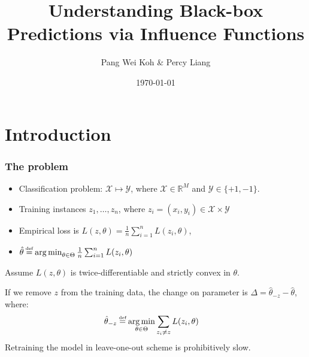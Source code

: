 \documentclass[UTF8]{beamer}
\title{Understanding Black-box Predictions via Influence Functions}
\author{Pang Wei Koh \& Percy Liang}
\date{\today}
\newcommand\myeq{\stackrel{\mathclap{\tiny\mbox{def}}}{=}}
\DeclareMathOperator*{\argmin}{arg\,min}
\begin{document}
\frame{\titlepage}

\section[Outline]{}
\frame{\tableofcontents}

\section{Introduction}
\begin{frame}
\frametitle{The problem}
\begin{itemize}
\item Classification problem: $\mathcal{X} \mapsto \mathcal{Y}$, where $\mathcal{X}\in\mathbb{R}^M$ and $\mathcal{Y}\in\{+1, -1\}$.\\
\item Training instances $z_1,\dots, z_n$, where $z_i = (x_i, y_i) \in \mathcal{X}\times\mathcal{Y}$\\
\item Empirical loss is $L(z, \theta) = \frac{1}{n}\sum_{i=1}^{n}L(z_i, \theta)$, 
\item $\hat{\theta} \myeq \argmin_{\theta\in\Theta}\frac{1}{n}\sum_{i=1}^nL(z_i, \theta)$
\end{itemize}
Assume $L(z, \theta)$ is twice-differentiable and strictly convex in $\theta$.

If we remove $z$ from the training data, the change on parameter is $\Delta = \hat{\theta}_{-z} - \hat{\theta}$, where:
\begin{align}
\hat{\theta}_{-z} &\myeq \argmin_{\theta\in\Theta}\sum_{z_i\neq z}L(z_i, \theta) \nonumber
\end{align}
Retraining the model in leave-one-out scheme is prohibitively slow.
\end{frame}
\end{document}

